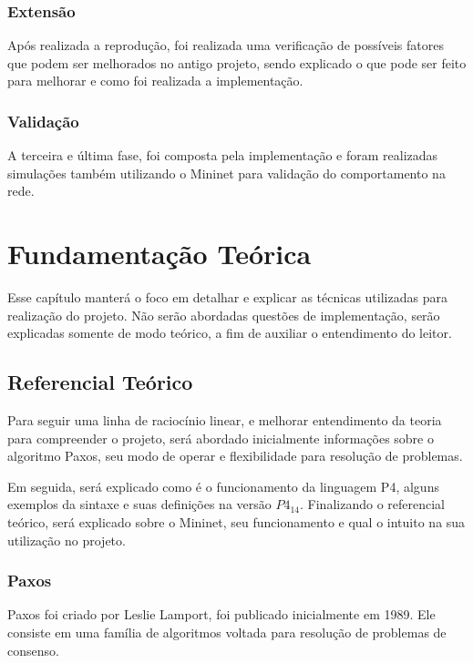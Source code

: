 \documentclass[
    12pt,
    openright, 
    oneside,
    a4paper,
    french,
    english,
    brazil
    ]{facom-ufu-abntex2}
\theoremstyle{definition}
\begin{document}
\subsection{Extensão}
Após realizada a reprodução, foi realizada uma verificação de possíveis fatores que podem ser 
melhorados no antigo projeto, sendo explicado o que pode ser feito para melhorar e como foi
realizada a implementação.

\subsection{Validação}
A terceira e última fase, foi composta pela implementação e foram realizadas
simulações também utilizando o Mininet para validação do comportamento na rede.
\cite{dang2015netpaxos}


\chapter{Fundamentação Teórica}
Esse capítulo manterá o foco em detalhar e explicar as técnicas utilizadas para realização 
do projeto. Não serão abordadas questões de implementação, serão explicadas somente de modo
teórico, a fim de auxiliar o entendimento do leitor.

\section{Referencial Teórico}
Para seguir uma linha de raciocínio linear, e melhorar entendimento da teoria
para compreender o projeto, será abordado inicialmente informações sobre o 
algoritmo Paxos, seu modo de operar e flexibilidade para resolução de problemas.

Em seguida, será explicado como é o funcionamento da linguagem P4, alguns exemplos da sintaxe e suas definições 
na versão $P4_{14}$. Finalizando o referencial teórico, será  explicado sobre o Mininet, seu funcionamento e qual 
o intuito na sua utilização no projeto.

\subsection{Paxos}
Paxos foi criado por Leslie Lamport, foi publicado inicialmente em 1989. Ele consiste em uma 
família de algoritmos voltada para resolução de problemas de consenso. 
\end{document}
